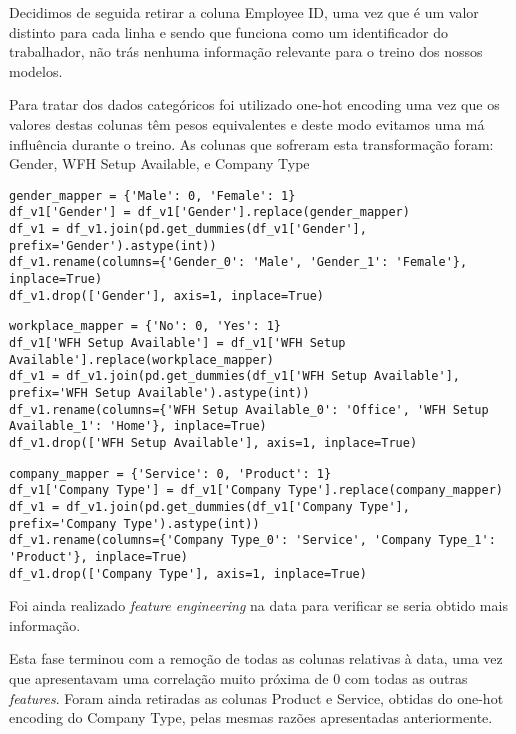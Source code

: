 Decidimos de seguida retirar a coluna Employee ID, uma vez que é um valor distinto para cada linha e sendo que funciona como um identificador do trabalhador, não trás nenhuma informação relevante para o treino dos nossos modelos.

Para tratar dos dados categóricos foi utilizado one-hot encoding uma vez que os valores destas colunas têm pesos equivalentes e deste modo evitamos uma má influência durante o treino. As colunas que sofreram esta transformação foram: Gender, WFH Setup Available, e Company Type

\begin{verbatim}
gender_mapper = {'Male': 0, 'Female': 1}
df_v1['Gender'] = df_v1['Gender'].replace(gender_mapper)
df_v1 = df_v1.join(pd.get_dummies(df_v1['Gender'], prefix='Gender').astype(int))
df_v1.rename(columns={'Gender_0': 'Male', 'Gender_1': 'Female'}, inplace=True)
df_v1.drop(['Gender'], axis=1, inplace=True)
\end{verbatim}

\begin{verbatim}
workplace_mapper = {'No': 0, 'Yes': 1}
df_v1['WFH Setup Available'] = df_v1['WFH Setup Available'].replace(workplace_mapper)
df_v1 = df_v1.join(pd.get_dummies(df_v1['WFH Setup Available'], prefix='WFH Setup Available').astype(int))
df_v1.rename(columns={'WFH Setup Available_0': 'Office', 'WFH Setup Available_1': 'Home'}, inplace=True)
df_v1.drop(['WFH Setup Available'], axis=1, inplace=True)
\end{verbatim}

\begin{verbatim}
company_mapper = {'Service': 0, 'Product': 1}
df_v1['Company Type'] = df_v1['Company Type'].replace(company_mapper)
df_v1 = df_v1.join(pd.get_dummies(df_v1['Company Type'], prefix='Company Type').astype(int))
df_v1.rename(columns={'Company Type_0': 'Service', 'Company Type_1': 'Product'}, inplace=True)
df_v1.drop(['Company Type'], axis=1, inplace=True)
\end{verbatim}

Foi ainda realizado \textit{feature engineering} na data para verificar se seria obtido mais informação.

Esta fase terminou com a remoção de todas as colunas relativas à data, uma vez que apresentavam uma correlação muito próxima de 0 com todas as outras \textit{features}. Foram ainda retiradas as colunas Product e Service, obtidas do one-hot encoding do Company Type, pelas mesmas razões apresentadas anteriormente.

